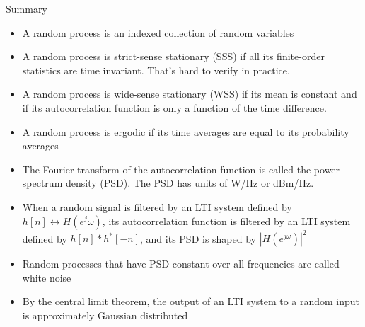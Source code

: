 \documentclass[10pt, handout]{beamer}
\begin{document}
\begin{frame}{Summary}
\begin{itemize}
	\item A random process is an indexed collection of random variables
	\item A random process is strict-sense stationary (SSS) if all its finite-order statistics are time invariant. That's hard to verify in practice.
	\item A random process is wide-sense stationary (WSS) if its mean is constant and if its autocorrelation function is only a function of the time difference. 
	\item A random process is ergodic if its time averages are equal to its probability averages
	\item The Fourier transform of the autocorrelation function is called the power spectrum density (PSD). The PSD has units of W/Hz or dBm/Hz.
	\item When a random signal is filtered by an LTI system defined by $h[n]\leftrightarrow H(e^j\omega)$, its autocorrelation function is filtered by an LTI system defined by $h[n]\ast h^*[-n]$, and its PSD is shaped by $|H(e^{j\omega})|^2$
	\item Random processes that have PSD constant over all frequencies are called white noise
	\item By the central limit theorem, the output of an LTI system to a random input is approximately Gaussian distributed
	
\end{itemize}
\end{frame}
\end{document}
